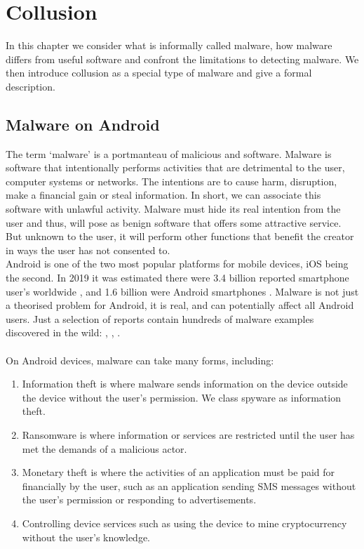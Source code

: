 \chapter{Collusion}
\label{chap:Collusion}

In this chapter we consider what is informally called malware, how malware differs from useful software and confront the limitations to detecting malware.  We then introduce collusion as a special type of malware and give a formal description.

\section{Malware on Android}
The term `malware' is a portmanteau of malicious and software.  Malware is software that intentionally performs activities that are detrimental to the user, computer systems or networks.  The intentions are to cause harm, disruption, make a financial gain or steal information.  In short, we can associate this software with unlawful activity.  Malware must hide its real intention from the user and thus, will pose as benign software that offers some attractive service.  But unknown to the user, it will perform other functions that benefit the creator in ways the user has not consented to.\\

Android is one of the two most popular platforms for mobile devices, iOS being the second.  In 2019 it was estimated there were 3.4 billion reported smartphone user's worldwide \cite{SmartphoneUsers2019}, and 1.6 billion were Android smartphones \cite{AndroidUsers2019}.  Malware is not just a theorised problem for Android, it is real, and can potentially affect all Android users.  Just a selection of reports contain hundreds of malware examples discovered in the wild: \cite{GhimobMalware}, \cite{AlienMalware}, \cite{CryloggerInTheWild}.\\%
\\
On Android devices, malware can take many forms, including:

\begin{enumerate}
\item Information theft is where malware sends information on the device outside the device without the user's permission.  We class spyware as information theft.
\item Ransomware is where information or services are restricted until the user has met the demands of a malicious actor.
\item Monetary theft is where the activities of an application must be paid for financially by the user, such as an application sending SMS messages without the user's permission or responding to advertisements.
\item Controlling device services such as using the device to mine cryptocurrency without the user's knowledge.
\end{enumerate}


